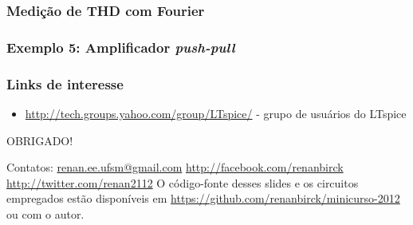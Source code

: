 \documentclass{beamer}
\begin{document}
\begin{frame}
\frametitle{Medição de THD com Fourier}
\end{frame}

\begin{frame}
\frametitle{Exemplo 5: Amplificador \textit{push-pull}}
\end{frame}

\begin{frame}
\frametitle{Links de interesse}
\begin{itemize}
\item \url{http://tech.groups.yahoo.com/group/LTspice/} - grupo de usuários do LTspice
\end{itemize}
\end{frame}


\begin{frame}
{\LARGE OBRIGADO!}
\end{frame}

\begin{frame}
Contatos: \url{renan.ee.ufsm@gmail.com} \url{http://facebook.com/renanbirck} \url{http://twitter.com/renan2112}\newline
O código-fonte desses slides e os circuitos empregados estão disponíveis em \url{https://github.com/renanbirck/minicurso-2012} ou com o autor.

\end{frame}
\end{document}

